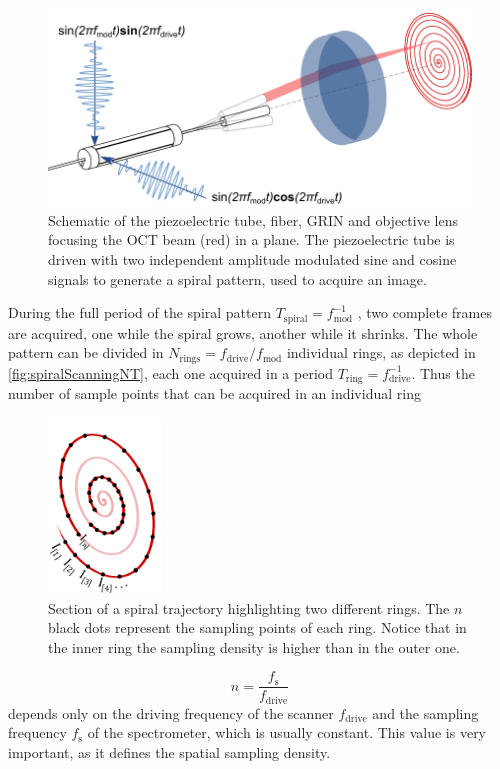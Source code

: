 \documentclass[10pt]{iopart}
\begin{document}
\begin{figure}[h!]\centering \includegraphics[width=\columnwidth]{figures/PZTDrivingMoving.pdf}
      \caption{Schematic of the piezoelectric tube, fiber, GRIN and objective lens focusing the OCT beam (red) in a plane. 
      The piezoelectric tube is driven with two independent amplitude modulated sine and cosine signals to generate a spiral pattern, used to acquire an image. }
      \label{fig:PZTDriving}
\end{figure}

During the full period of the spiral pattern $T_\mathrm{spiral}=f_\mathrm{mod}^{-1}$ , two complete frames are acquired, one while the spiral grows, another while it shrinks. The whole pattern can be divided in $N_\mathrm{rings} = f_\mathrm{drive}/f_\mathrm{mod}$ individual rings, as depicted in \autoref{fig:spiralScanningNT}, each one acquired in a period $T_\mathrm{ring}=f_\mathrm{drive}^{-1}$. Thus the number of sample points that can be acquired in an individual ring
\begin{figure}[h!]\centering
      \includegraphics[width=3cm]{figures/spiralScanningNT.pdf}
      \caption{Section of a spiral trajectory highlighting two different rings. The $n$ black dots represent the sampling points of each ring. Notice that in the inner ring the sampling density is higher than in the outer one.}
      \label{fig:spiralScanningNT}
\end{figure}
\begin{equation}
n = \frac{f_\mathrm{s}}{f_\mathrm{drive}}
\label{eq:nT}
\end{equation}
depends only on the driving frequency of the scanner $f_\mathrm{drive}$ and the sampling frequency $f_\mathrm{s}$ of the spectrometer, which is usually constant. This value is very important, as it defines the spatial sampling density. 
\end{document}

